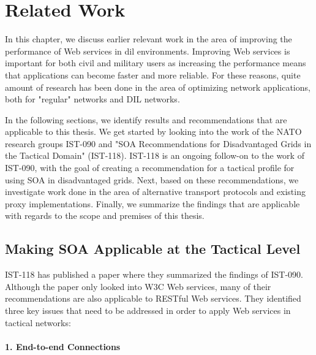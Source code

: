 \chapter{Related Work}
\label{chapter:related-work}


In this chapter, we discuss earlier relevant work in the area of improving the
performance of Web services in \gls{dil} environments. Improving Web services
is important for both civil and military users as increasing the performance
means that applications can become faster and more reliable. For these reasons,
quite amount of research has been done in the area of optimizing network
applications, both for "regular" networks and DIL networks.

In the following sections, we identify results and recommendations that are
applicable to this thesis. We get started by looking into the work of the NATO
research groups IST-090 and "SOA Recommendations for Disadvantaged Grids in
the Tactical Domain" (IST-118). IST-118 is an ongoing follow-on to the work of
IST-090, with the goal of creating a recommendation for a tactical profile for
using SOA in disadvantaged grids. Next, based on these recommendations, we
investigate work done in the area of alternative transport protocols and
existing proxy implementations.  Finally, we summarize the findings that are
applicable with regards to the scope and premises of this thesis.

\section{Making SOA Applicable at the Tactical Level}

IST-118 has published a paper\cite{ist-118} where they summarized the findings
of IST-090. Although the paper only looked into W3C Web services, many of their
recommendations are also applicable to RESTful Web services. They identified
three key issues that need to be addressed in order to apply Web services in
tactical networks:

\label{section:DIL-problems}

\subsubsection{1. End-to-end Connections}

